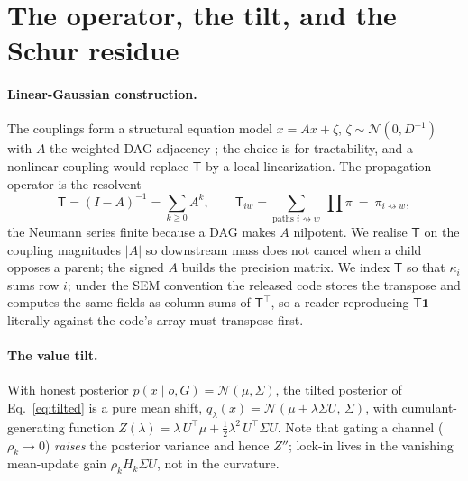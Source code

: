 \documentclass[11pt]{article}
\newcommand{\rw}{\rightsquigarrow}
\newcommand{\Top}{\mathsf{T}}          %
\newcommand{\bone}{\mathbf{1}}         %
\begin{document}
\clearpage
\appendix
\section{The operator, the tilt, and the Schur residue}
\label{app:operator}

\paragraph{Linear-Gaussian construction.} The couplings form a structural equation model $x=Ax+\zeta$,
$\zeta\sim\mathcal N(0,D^{-1})$ with $A$ the weighted DAG adjacency \citep{koller2009}; the choice is
for tractability, and a nonlinear coupling would replace $\Top$ by a local linearization. The
propagation operator is the resolvent
\begin{equation}
\Top=(I-A)^{-1}=\sum_{k\ge 0}A^k,\qquad
\Top_{iw}=\!\!\sum_{\text{paths }i\rw w}\ \prod \pi\ =\ \pi_{i\rw w},
\label{eq:Top-full}
\end{equation}
the Neumann series finite because a DAG makes $A$ nilpotent. We realise $\Top$ on the coupling
magnitudes $|A|$ so downstream mass does not cancel when a child opposes a parent; the signed $A$
builds the precision matrix. We index $\Top$ so that $\kappa_i$ sums row $i$; under the SEM
convention the released code stores the transpose and computes the same fields as column-sums of
$\Top^{\!\top}$, so a reader reproducing $\Top\bone$ literally against the code's array must
transpose first.

\paragraph{The value tilt.} With honest posterior $p(x\mid o,G)=\mathcal N(\mu,\Sigma)$, the tilted
posterior of Eq.~\eqref{eq:tilted} is a pure mean shift,
$q_\lambda(x)=\mathcal N(\mu+\lambda\Sigma U,\,\Sigma)$, with cumulant-generating function
$Z(\lambda)=\lambda\,U^{\!\top}\!\mu+\tfrac12\lambda^2\,U^{\!\top}\!\Sigma U$. Note that gating a
channel ($\rho_k\to0$) \emph{raises} the posterior variance and hence $Z''$; lock-in lives in the
vanishing mean-update gain $\rho_k H_k\Sigma U$, not in the curvature.
\end{document}
